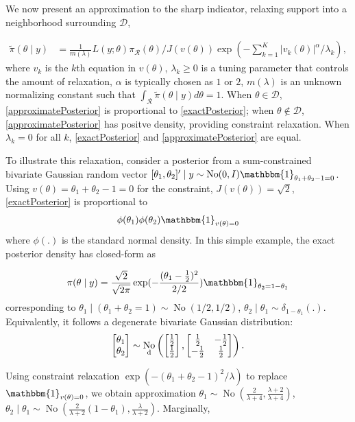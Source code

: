 \documentclass[10pt]{article}
\newcommand{\be}{\begin{equation}\begin{aligned}}
\newcommand{\ee}{\end{aligned}\end{equation}}
\newcommand{\mc}[1]{\mathcal{#1}}
\DeclareMathOperator{\No}{No}
\DeclareMathOperator{\1}{\mathbbm{1}}
\begin{document}
We now present an approximation to the sharp indicator, relaxing support into a
neighborhood surrounding $\mc D$,

\be
\label{approximatePosterior}
\tilde{\pi}(\theta\mid y)  & = \frac{1}{m(\lambda)} L(y;\theta) \pi_{\mc
R}(\theta) /J(v(\theta)) \exp (- \sum_{k=1}^K |v_k(\theta)|^\alpha/\lambda_k),
\ee
where $v_k$ is the $k$th equation in $v(\theta)$, $\lambda_k\ge 0$ is a
tuning parameter that controls the amount of relaxation, $\alpha$ is
typically chosen as $1$ or $2$, $m(\lambda)$ is an unknown normalizing
constant such that $\int_{\mc R} \tilde{\pi}(\theta\mid y) d\theta=1$.
When $\theta\in \mc D$, \eqref{approximatePosterior} is proportional to
\eqref{exactPosterior}; when $\theta\not\in \mc D$,
\eqref{approximatePosterior} has positve density, providing constraint
relaxation. When $\lambda_k=0$ for all $k$, \eqref{exactPosterior} and
\eqref{approximatePosterior} are equal.

To illustrate this relaxation, consider a posterior from a sum-constrained
bivariate Gaussian random vector $[\theta_1,\theta_2]' \mid y \sim \No(0,I)
\mathbbm{1}_{\theta_1+\theta_2-1=0}$. Using
$v(\theta)=\theta_1+\theta_2-1=0$ for the
constraint, $J(v(\theta))=\sqrt 2$, \eqref{exactPosterior} is proportional to 
$$
\phi(\theta_1)
\phi(\theta_2)\mathbbm{1}_{v(\theta)=0}
$$
where $\phi(.)$ is the standard
normal density. In this simple example, the exact posterior density has closed-form
as

$$
\pi(\theta\mid y)=\frac{\sqrt{2}}{\sqrt{2\pi}} \exp(-\frac{(\theta_1-\frac{1}{2})^2}{2/2})
\mathbbm{1}_{\theta_2=1-\theta_1}
$$
corresponding to $\theta_1\mid (\theta_1+ \theta_2=1) \sim
\No(1/2,1/2)$, $\theta_2\mid \theta_1 \sim \delta_{1-\theta_1}(.)$.
Equivalently, it follows a degenerate bivariate Gaussian distribution:
$$\begin{bmatrix} \theta_1 \\ \theta_2 \end{bmatrix} \sim
\No_{\text d} \left(
\begin{bmatrix} \frac{1}{2} \\ \frac{1}{2} \end{bmatrix},
\begin{bmatrix} \frac{1}{2} & -\frac{1}{2}  \\  -\frac{1}{2}  & \frac{1}{2} \end{bmatrix}
\right).$$

Using constraint relaxation $ \exp( - (\theta_1+\theta_2-1)^2/\lambda)$ to
replace $\mathbbm{1}_{v(\theta)=0}$, we obtain approximation $\theta_1 \sim \No(\frac{2}{\lambda+4},\frac{\lambda+2}{\lambda+4})$, $\theta_2\mid \theta_1 \sim \No(\frac{2}{\lambda+2}(1-\theta_1),\frac{\lambda}{\lambda+2})$. Marginally, 
\end{document}
